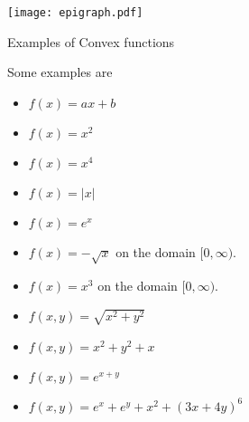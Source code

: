 \documentclass[../open-optimization/open-optimization.tex]{subfiles}
\begin{document}
\texttt{[image: epigraph.pdf]}\footnotemark




\begin{example}{Examples of Convex functions}{}

Some examples are 

\begin{itemize}
\item $f(x) = ax + b$
\item $f(x) = x^2$
\item $f(x) = x^4$
\item $f(x) = |x|$
\item $f(x) = e^x$
\item $f(x) = - \sqrt{x}$ on the domain $[0,\infty)$.
\item $f(x) = x^3$ on the domain $[0,\infty)$.
\item $f(x,y) = 
\sqrt{x^2 + y^2}$
\item $f(x,y) = x^2 + y^2 + x$
\item $ f(x,y) = e^{x+y}$
\item $f(x,y) = e^{x} + e^{y} + x^2+  (3x + 4y)^6$
\end{itemize}

\end{example}
\end{document}
